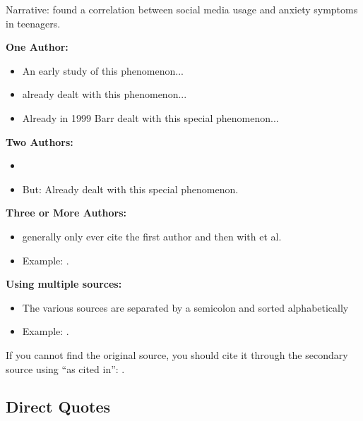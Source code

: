Narrative: \textcite{barr1999} found a correlation between social media usage and anxiety symptoms in teenagers.

\textbf{One Author:}
\begin{itemize}
    \item An early study of this phenomenon\parencite{barr1999}...
    \item \textcite{barr1999} already dealt with this phenomenon...
    \item  Already in 1999 Barr dealt with this special phenomenon...

\end{itemize}

\textbf{Two Authors:}
\begin{itemize}
    \item \parencite{cadogan2013}
    \item But: Already \textcite{cadogan2013} dealt with this special phenomenon.
\end{itemize}

\textbf{Three or More Authors:}
\begin{itemize}
    \item generally only ever cite the first author and then with et al.
    \item Example: \parencite{beutel2004}.
\end{itemize}

\textbf{Using multiple sources:}
\begin{itemize}
    \item The various sources are separated by a semicolon and sorted alphabetically
    \item Example: \parencite{barr1999, cadogan2013, smith2015, smith2017}.
\end{itemize}

If you cannot find the original source, you should cite it through the secondary source using “as cited in”: \parencite[as cited in Parker, 2021]{smith2017}.

\subsection{Direct Quotes}

